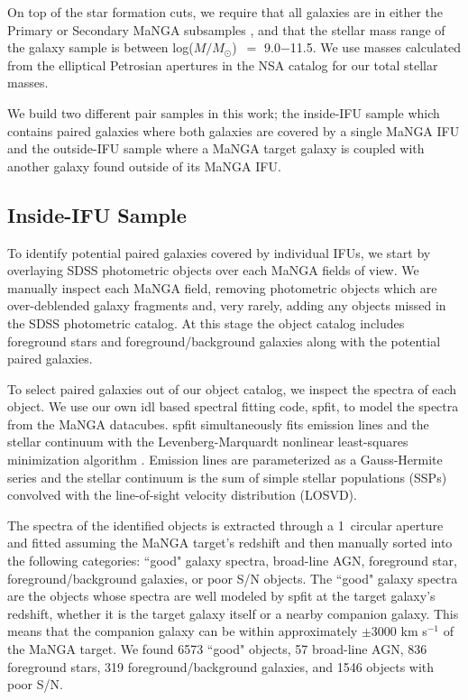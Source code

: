\documentclass[iop,revtex4,twocolumn,apj,numberedappendix,appendixfloats]{emulateapj}
\newcommand{\logm}{log($M/M_{\odot}$)}
\begin{document}
On top of the star formation cuts, we require that all galaxies are in either the Primary or Secondary MaNGA subsamples \citep{Wake:2017}, and that the stellar mass range of the galaxy sample is between \logm\ $=$ 9.0$-$11.5. We use masses calculated from the elliptical Petrosian apertures in the NSA catalog for our total stellar masses. 

We build two different pair samples in this work; the inside-IFU sample which contains paired galaxies where both galaxies are covered by a single MaNGA IFU and the outside-IFU sample where a MaNGA target galaxy is coupled with another galaxy found outside of its MaNGA IFU. 

\subsection{Inside-IFU Sample}\label{sec:inside}

To identify potential paired galaxies covered by individual IFUs, we start by overlaying SDSS photometric objects over each MaNGA fields of view. We manually inspect each MaNGA field, removing photometric objects which are over-deblended galaxy fragments and, very rarely, adding any objects missed in the SDSS photometric catalog. At this stage the object catalog includes foreground stars and foreground/background galaxies along with the potential paired galaxies. 

To select paired galaxies out of our object catalog, we inspect the spectra of each object. We use our own {\sc idl} based spectral fitting code, {\sc spfit}, to model the spectra from the MaNGA datacubes. {\sc spfit} simultaneously fits emission lines and the stellar continuum with the Levenberg-Marquardt nonlinear least-squares minimization algorithm . Emission lines are parameterized as a Gauss-Hermite series and the stellar continuum is the sum of simple stellar populations (SSPs) convolved with the line-of-sight velocity distribution (LOSVD).

The spectra of the identified objects is extracted through a 1\arcsec\ circular aperture and fitted assuming the MaNGA target's redshift and then manually sorted into the following categories: ``good" galaxy spectra, broad-line AGN, foreground star, foreground/background galaxies, or poor S/N objects. The ``good" galaxy spectra are the objects whose spectra are well modeled by {\sc spfit} at the target galaxy's redshift, whether it is the target galaxy itself or a nearby companion galaxy. This means that the companion galaxy can be within approximately $\pm$3000 km s$^{-1}$ of the MaNGA target. We found 6573 ``good" objects, 57 broad-line AGN, 836 foreground stars, 319 foreground/background galaxies, and 1546 objects with poor S/N. 
\end{document}
